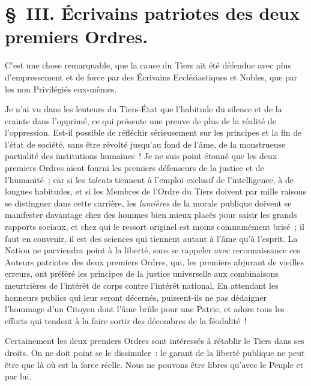\documentclass[french,twoside]{book} %
\begin{document}
\section[{§ III. Écrivains patriotes des deux premiers Ordres.}]{§ III. Écrivains patriotes des deux premiers Ordres.}
\noindent C’est une chose remarquable, que la cause du Tiers ait été défendue avec plus d’empressement et de force par des Écrivains Ecclésiastiques et Nobles, que par les non Privilégiés eux-mêmes.\par
Je n’ai vu dans les lenteurs du Tiers-État que l’habitude du silence et de la crainte dans l’opprimé, ce qui présente une preuve de plus de la réalité de l’oppression. Est-il possible de réfléchir sérieusement sur les principes et la fin de l’état de société, sans être révolté jusqu’au fond de l’âme, de la monstrueuse partialité des institutions humaines ! Je ne suis point étonné que les deux premiers Ordres aient fourni les premiers défenseurs de la justice et de l’humanité ; car si les {\itshape talents} tiennent à l’emploi exclusif de l’intelligence, à de longues habitudes, et si les Membres de l’Ordre du Tiers doivent par mille raisons se distinguer dans cette carrière, les {\itshape lumières} de la morale publique doivent se manifester davantage chez des hommes bien mieux placés pour saisir les grands rapports sociaux, et chez qui le ressort originel est moins communément brisé ; il faut en convenir, il est des sciences qui tiennent autant à l’âme qu’à l’esprit. La Nation ne parviendra point à la liberté, sans se rappeler avec reconnaissance ces Auteurs patriotes des deux premiers Ordres, qui, les premiers abjurant de vieilles erreurs, ont préféré les principes de la justice universelle aux combinaisons meurtrières de l’intérêt de corps contre l’intérêt national. En attendant les honneurs publics qui leur seront décernés, puissent-ils ne pas dédaigner l’hommage d’un Citoyen dont l’âme brûle pour une Patrie, et adore tous les efforts qui tendent à la faire sortir des décombres de la féodalité !\par
Certainement les deux premiers Ordres sont intéressés à rétablir le Tiers dans ses droits. On ne doit point se le dissimuler : le garant de la liberté publique ne peut être que là où est la force réelle. Nous ne pouvons être libres qu’avec le Peuple et par lui.\par
\end{document}
